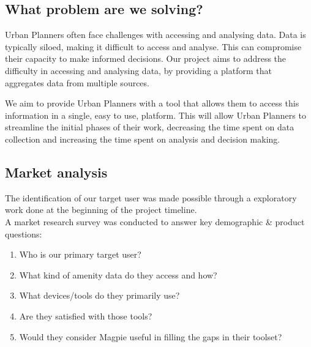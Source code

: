\subsection{What problem are we solving?}
Urban Planners often face challenges with accessing and analysing data. Data is
typically siloed, making it difficult to access and analyse. This can compromise
their capacity to make informed decisions. Our project aims to address the
difficulty in accessing and analysing data, by providing a platform that
aggregates data from multiple sources.

We aim to provide Urban Planners with a tool that allows them to access this
information in a single, easy to use, platform. This will allow Urban Planners
to streamline the initial phases of their work, decreasing the time spent on
data collection and increasing the time spent on analysis and decision making.

\subsection{Market analysis}
The identification of our target user was made possible through a exploratory work done at the beginning of the project timeline.\\
A market research survey was conducted to answer key demographic \& product questions:
\begin{enumerate}
    \item Who is our primary target user?
    \item What kind of amenity data do they access and how?
    \item What devices/tools do they primarily use?
    \item Are they satisfied with those tools?
    \item Would they consider Magpie useful in filling the gaps in their toolset?
\end{enumerate}

\newpage{}